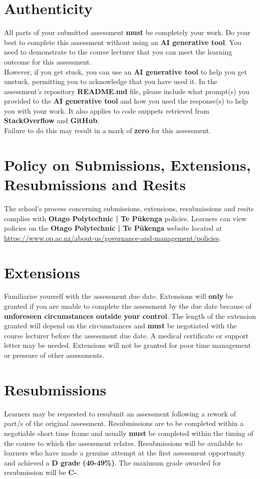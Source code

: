 \documentclass{article}
\begin{document}
\section*{Authenticity}
All parts of your submitted assessment \textbf{must} be completely your work. Do your best to complete this assessment without using an \textbf{AI generative tool}. You need to demonstrate to the course lecturer that you can meet the learning outcome for this assessment. \\
 
 However, if you get stuck, you can use an \textbf{AI generative tool} to help you get unstuck, permitting you to acknowledge that you have used it. In the assessment's repository \textbf{README.md} file, please include what prompt(s) you provided to the \textbf{AI generative tool} and how you used the response(s) to help you with your work. It also applies to code snippets retrieved from \textbf{StackOverflow} and \textbf{GitHub}. \\
 
 Failure to do this may result in a mark of \textbf{zero} for this assessment.

\section*{Policy on Submissions, Extensions, Resubmissions and Resits}
The school's process concerning submissions, extensions, resubmissions and resits complies with \textbf{Otago Polytechnic | Te Pūkenga} policies. Learners can view policies on the \textbf{Otago Polytechnic | Te Pūkenga} website located at \href{https://www.op.ac.nz/about-us/governance-and-management/policies}{https://www.op.ac.nz/about-us/governance-and-management/policies}. 

\section*{Extensions}
Familiarise yourself with the assessment due date. Extensions will \textbf{only} be granted if you are unable to complete the assessment by the due date because of \textbf{unforeseen circumstances outside your control}. The length of the extension granted will depend on the circumstances and \textbf{must} be negotiated with the course lecturer before the assessment due date. A medical certificate or support letter may be needed. Extensions will not be granted for poor time management or pressure of other assessments.

\section*{Resubmissions}
Learners may be requested to resubmit an assessment following a rework of part/s of the original assessment. Resubmissions are to be completed within a negotiable short time frame and usually \textbf{must} be completed within the timing of the course to which the assessment relates. Resubmissions will be available to learners who have made a genuine attempt at the first assessment opportunity and achieved a \textbf{D grade (40-49\%)}. The maximum grade awarded for resubmission will be \textbf{C-}.
\end{document}

